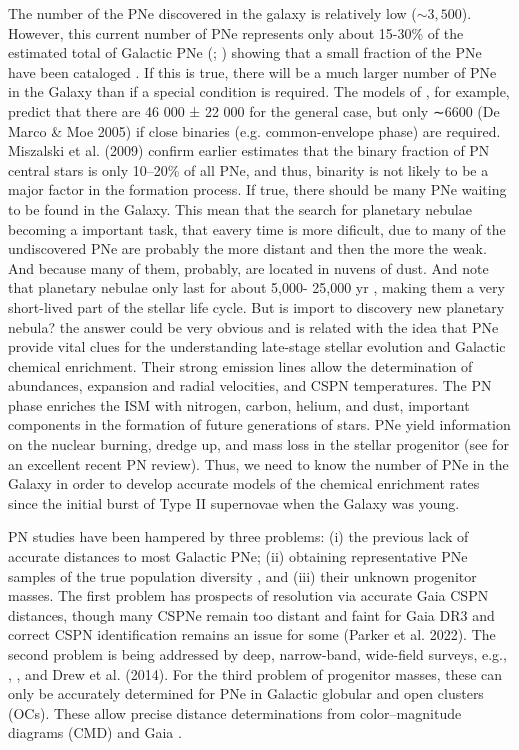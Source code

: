 \documentclass[fleqn,usenatbib]{mnras}
\begin{document}
The number of the PNe discovered in the galaxy is relatively low (\(\sim 3,500\)). However,
this current number of PNe represents only about 15-30\% of the estimated
total of Galactic PNe (\citealp{Frew:2008}; \citealp{Jacoby:2010}) showing that a small fraction
of the PNe have been cataloged \citep{Frew:2017}. If this is true, there will be a much larger
number of PNe in the Galaxy than if a special condition
is required. The models of \citet{Moe:2006}, for
example, predict that there are 46 000 ± 22 000 for the general case,
but only ∼6600 (De Marco & Moe 2005) if
close binaries (e.g. common-envelope phase) are required.
Miszalski et al. (2009) confirm earlier estimates that the
binary fraction of PN central stars is only 10–20\% of all
PNe, and thus, binarity is not likely to be a major factor in
the formation process. If true, there should be many PNe
waiting to be found in the Galaxy. This mean that the search for planetary nebulae
becoming a important task, that eavery time is more dificult, due to many of
the undiscovered PNe are probably
the more distant and then the more the weak. And because many of them, probably, are located
in nuvens of dust. And note that planetary nebulae only last for about 5,000-
25,000 yr \citep{Badenes:2015}, making them a very short-lived part of the stellar life cycle.
But is import to discovery new planetary nebula? the answer could be very obvious and is
related with the idea that PNe provide vital clues for the understanding late-stage stellar
evolution and Galactic chemical enrichment. Their strong emission lines allow the determination
of abundances, expansion and radial velocities, and
CSPN temperatures. The PN phase
enriches the ISM with nitrogen, carbon, helium, and dust,
important components in the formation of future generations
of stars. PNe yield information on the nuclear
burning, dredge up, and mass loss in the stellar progenitor
(see \citealp{Kwitter:2022} for an excellent recent PN
review). Thus, we need to know the number of PNe in
the Galaxy in order to develop accurate models of the
chemical enrichment rates since the initial burst of Type II
supernovae when the Galaxy was young.

PN studies have been hampered by three problems:
(i) the previous lack of accurate distances to most Galactic
PNe; (ii) obtaining representative PNe samples of the true
population diversity \citep{Parker:2022}, and (iii) their unknown
progenitor masses. The first problem has prospects of
resolution via accurate Gaia CSPN distances, though many
CSPNe remain too distant and faint for Gaia DR3 and correct
CSPN identification remains an issue for some (Parker et al.
2022). The second problem is being addressed by deep, narrow-band,
wide-field surveys, e.g., \citet{Parker:2005},
\citet{Drew:2005}, and Drew et al. (2014). For the third problem
of progenitor masses, these can only
be accurately determined for PNe in Galactic globular and
open clusters (OCs). These allow precise distance determinations
from color–magnitude diagrams (CMD) and Gaia \citep{Fragkou:2022}.
\end{document}
